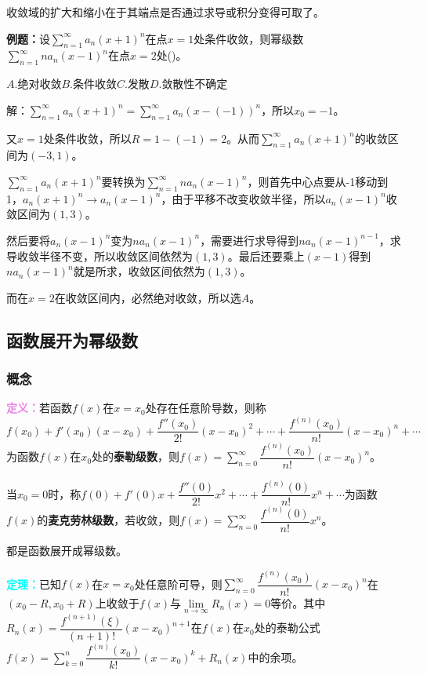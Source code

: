 收敛域的扩大和缩小在于其端点是否通过求导或积分变得可取了。

\textbf{例题：}设$\sum\limits_{n=1}^\infty a_n(x+1)^n$在点$x=1$处条件收敛，则幂级数$\sum\limits_{n=1}^\infty na_n(x-1)^n$在点$x=2$处()。

$A.$绝对收敛\qquad$B.$条件收敛\qquad$C.$发散\qquad$D.$敛散性不确定

解：$\sum\limits_{n=1}^\infty a_n(x+1)^n=\sum\limits_{n=1}^\infty a_n(x-(-1))^n$，所以$x_0=-1$。

又$x=1$处条件收敛，所以$R=1-(-1)=2$。从而$\sum\limits_{n=1}^\infty a_n(x+1)^n$的收敛区间为$(-3,1)$。

$\sum\limits_{n=1}^\infty a_n(x+1)^n$要转换为$\sum\limits_{n=1}^\infty na_n(x-1)^n$，则首先中心点要从-1移动到1，$a_n(x+1)^n\to a_n(x-1)^n$，由于平移不改变收敛半径，所以$a_n(x-1)^n$收敛区间为$(1,3)$。

然后要将$a_n(x-1)^n$变为$na_n(x-1)^n$，需要进行求导得到$na_n(x-1)^{n-1}$，求导收敛半径不变，所以收敛区间依然为$(1,3)$。最后还要乘上$(x-1)$得到$na_n(x-1)^n$就是所求，收敛区间依然为$(1,3)$。

而在$x=2$在收敛区间内，必然绝对收敛，所以选$A$。

\subsection{函数展开为幂级数}

\subsubsection{概念}

\textcolor{violet}{\textbf{定义：}}若函数$f(x)$在$x=x_0$处存在任意阶导数，则称$f(x_0)+f'(x_0)(x-x_0)+\dfrac{f''(x_0)}{2!}(x-x_0)^2+\cdots+\dfrac{f^{(n)}(x_0)}{n!}(x-x_0)^n+\cdots$为函数$f(x)$在$x_0$处的\textbf{泰勒级数}，则$f(x)=\sum\limits_{n=0}^\infty\dfrac{f^{(n)}(x_0)}{n!}(x-x_0)^n$。

当$x_0=0$时，称$f(0)+f'(0)x+\dfrac{f''(0)}{2!}x^2+\cdots+\dfrac{f^{(n)}(0)}{n!}x^n+\cdots$为函数$f(x)$的\textbf{麦克劳林级数}，若收敛，则$f(x)=\sum\limits_{n=0}^\infty\dfrac{f^{(n)}(0)}{n!}x^n$。

都是函数展开成幂级数。

\textcolor{aqua}{\textbf{定理：}}已知$f(x)$在$x=x_0$处任意阶可导，则$\sum\limits_{n=0}^\infty\dfrac{f^{(n)}(x_0)}{n!}(x-x_0)^n$在$(x_0-R,x_0+R)$上收敛于$f(x)$与$\lim\limits_{n\to\infty}R_n(x)=0$等价。其中$R_n(x)=\dfrac{f^{(n+1)}(\xi)}{(n+1)!}(x-x_0)^{n+1}$在$f(x)$在$x_0$处的泰勒公式$f(x)=\sum\limits_{k=0}^n\dfrac{f^{(n)}(x_0)}{k!}(x-x_0)^k+R_n(x)$中的余项。


